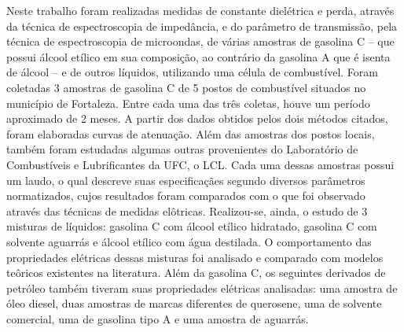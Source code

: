 
\begin{resumo}


Neste trabalho foram realizadas medidas de constante dielétrica e perda, através da técnica de espectroscopia de impedância, e do parâmetro de transmissão, pela técnica de espectroscopia de microondas, de várias amostras de gasolina C -- que possui álcool etílico em sua composição, ao contrário da gasolina A que é isenta de álcool -- e de outros líquidos, utilizando uma célula de combustível. Foram coletadas 3 amostras de gasolina C de 5 postos de combustível situados no município de Fortaleza. Entre cada uma das três coletas, houve um período aproximado de 2 meses. A partir dos dados obtidos pelos dois métodos citados, foram elaboradas curvas de atenuação. Além das amostras dos postos locais, também foram estudadas algumas outras provenientes do Laboratório de Combustíveis e Lubrificantes da UFC, o LCL. Cada uma dessas amostras possui um laudo, o qual descreve suas especificaçães segundo diversos parâmetros normatizados, cujos resultados foram comparados com o que foi observado através das técnicas de medidas elôtricas. Realizou-se, ainda, o estudo de 3 misturas de líquidos: gasolina C com álcool etílico hidratado, gasolina C com solvente aguarrás e álcool etílico com água destilada. O comportamento das propriedades elétricas dessas misturas foi analisado e comparado com modelos teôricos existentes na literatura. Além da gasolina C, os seguintes derivados de petróleo também tiveram suas propriedades elétricas analisadas: uma amostra de óleo diesel, duas amostras de marcas diferentes de querosene, uma de solvente comercial, uma de gasolina tipo A e uma amostra de aguarrás. %

\end{resumo}

